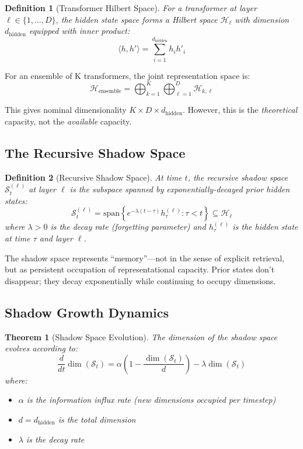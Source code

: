 \documentclass[reprint, amsmath, amssymb, aps, prd]{revtex4-2}
\newtheorem{definition}{Definition}[section]
\newtheorem{theorem}{Theorem}[section]
\begin{document}
\begin{definition}[Transformer Hilbert Space]
For a transformer at layer $\ell \in \{1, \ldots, D\}$, the hidden state space forms a Hilbert space $\mathcal{H}_\ell$ with dimension $d_{\text{hidden}}$ equipped with inner product:
\[
\langle h, h' \rangle = \sum_{i=1}^{d_{\text{hidden}}} h_i h'_i
\]
\end{definition}

For an ensemble of K transformers, the joint representation space is:
\[
\mathcal{H}_{\text{ensemble}} = \bigoplus_{k=1}^K \bigoplus_{\ell=1}^D \mathcal{H}_{k,\ell}
\]

This gives nominal dimensionality $K \times D \times d_{\text{hidden}}$. However, this is the \textit{theoretical} capacity, not the \textit{available} capacity.

\subsection{The Recursive Shadow Space}

\begin{definition}[Recursive Shadow Space]
At time $t$, the recursive shadow space $\mathcal{S}_t^{(\ell)}$ at layer $\ell$ is the subspace spanned by exponentially-decayed prior hidden states:
\[
\mathcal{S}_t^{(\ell)} = \text{span}\left\{ e^{-\lambda(t-\tau)} h_\tau^{(\ell)} : \tau < t \right\} \subseteq \mathcal{H}_\ell
\]
where $\lambda > 0$ is the decay rate (forgetting parameter) and $h_\tau^{(\ell)}$ is the hidden state at time $\tau$ and layer $\ell$.
\end{definition}

The shadow space represents ``memory''---not in the sense of explicit retrieval, but as persistent occupation of representational capacity. Prior states don't disappear; they decay exponentially while continuing to occupy dimensions.

\subsection{Shadow Growth Dynamics}

\begin{theorem}[Shadow Space Evolution]
The dimension of the shadow space evolves according to:
\[
\frac{d}{dt}\dim(\mathcal{S}_t) = \alpha\left(1 - \frac{\dim(\mathcal{S}_t)}{d}\right) - \lambda \dim(\mathcal{S}_t)
\]
where:
\begin{itemize}
    \item $\alpha$ is the information influx rate (new dimensions occupied per timestep)
    \item $d = d_{\text{hidden}}$ is the total dimension
    \item $\lambda$ is the decay rate
\end{itemize}
\end{theorem}
\end{document}
